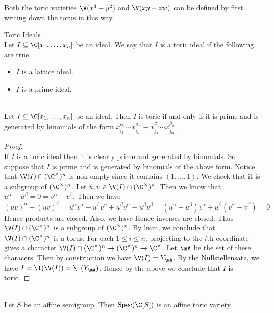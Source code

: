 \documentclass[a4paper]{article}
\begin{document}
Both the toric varieties $\V(x^3-y^2)$ and $\V(xy-zw)$ can be defined by first writing down the torus in this way. 

\begin{defn}{Toric Ideals}{}\\
Let $I\subseteq\C[x_1,\dots,x_n]$ be an ideal. We say that $I$ is a toric ideal if the following are true. 
\begin{itemize}
\item $I$ is a lattice ideal. 
\item $I$ is a prime ideal. 
\end{itemize}
\end{defn}

\begin{lmm}{}{}\\
Let $I\subseteq\C[x_1,\dots,x_n]$ be an ideal. Then $I$ is toric if and only if it is prime and is generated by binomials of the form $x_{i_1}^{\alpha_1}\cdots x_{i_n}^{\alpha_n}-x_{j_1}^{\beta_1}\cdots x_{j_m}^{\beta_m}$. 
\begin{proof}\\
If $I$ is a toric ideal then it is clearly prime and generated by binomials. So suppose that $I$ is prime and is generated by binomials of the above form. Notice that $\V(I)\cap(\C^\times)^n$ is non-empty since it contains $(1,\dots,1)$. We check that it is a subgroup of $(\C^\times)^n$. Let $u,v\in\V(I)\cap(\C^\times)^n$. Then we know that $u^\alpha-u^\beta=0=v^\alpha-v^\beta$. Then we have $$(uv)^\alpha-(uv)^\beta=u^\alpha v^\alpha-u^\beta v^\alpha+u^\beta v^\alpha-u^\beta v^\beta=(u^\alpha-u^\beta)v^\alpha+u^\beta(v^\alpha-v^\beta)=0$$ Hence products are closed. Also, we have  Hence inverses are closed. Thus $\V(I)\cap(\C^\times)^n$ is a subgroup of $(\C^\times)^n$. By lmm, we conclude that $\V(I)\cap(\C^\times)^n$ is a torus. For each $1\leq i\leq n$, projecting to the $i$th coordinate gives a character $\V(I)\cap(\C^\times)^n\to(\C^\times)^n\to\C^\times$. Let $\mA$ be the set of these characers. Then by construction we have $\V(I)=Y_\mA$. By the Nullstellensatz, we have $I=\I(\V(I))=\I(Y_\mA)$. Hence by the above we conclude that $I$ is toric. 
\end{proof}
\end{lmm}

\begin{prp}{}{}\\
Let $S$ be an affine semigroup. Then $\text{Spec}(\C[S])$ is an affine toric variety. 
\end{prp}
\end{document}

